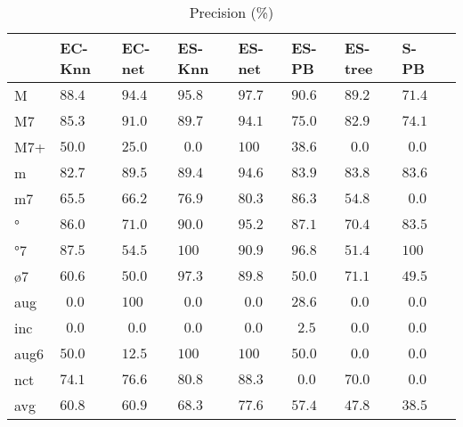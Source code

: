 \documentclass{article}
\begin{document}
\begin{table}
  \centering
\begin{tabular}{l|p{0.5cm}p{0.5cm}p{0.5cm}p{0.5cm}p{0.5cm}p{0.5cm}p{0.5cm}p{0.5cm}}
     &   EC-Knn &   EC-net &   ES-Knn &   ES-net &    ES-PB &  ES-tree &   S-PB \\ \hline
   M & $  88.4$ & $  94.4$ & $  95.8$ & $  97.7$ & $  90.6$ & $  89.2$ & $  71.4$ \\
  M7 & $  85.3$ & $  91.0$ & $  89.7$ & $  94.1$ & $  75.0$ & $  82.9$ & $  74.1$ \\
 M7+ & $  50.0$ & $  25.0$ & $ ~~0.0$ & $ 100  $ & $  38.6$ & $ ~~0.0$ & $ ~~0.0$ \\
   m & $  82.7$ & $  89.5$ & $  89.4$ & $  94.6$ & $  83.9$ & $  83.8$ & $  83.6$ \\
  m7 & $  65.5$ & $  66.2$ & $  76.9$ & $  80.3$ & $  86.3$ & $  54.8$ & $ ~~0.0$ \\
  °  & $  86.0$ & $  71.0$ & $  90.0$ & $  95.2$ & $  87.1$ & $  70.4$ & $  83.5$ \\
 °7  & $  87.5$ & $  54.5$ & $ 100$   & $  90.9$ & $  96.8$ & $  51.4$ & $ 100$ \\
 ø7  & $  60.6$ & $  50.0$ & $  97.3$ & $  89.8$ & $  50.0$ & $  71.1$ & $  49.5$ \\
 aug & $ ~~0.0$ & $ 100  $ & $ ~~0.0$ & $ ~~0.0$ & $  28.6$ & $ ~~0.0$ & $ ~~0.0$ \\
 inc & $ ~~0.0$ & $ ~~0.0$ & $ ~~0.0$ & $ ~~0.0$ & $ ~~2.5$ & $ ~~0.0$ & $ ~~0.0$ \\
aug6 & $  50.0$ & $  12.5$ & $ 100  $ & $ 100  $ & $  50.0$ & $ ~~0.0$ & $ ~~0.0$ \\
 nct & $  74.1$ & $  76.6$ & $  80.8$ & $  88.3$ & $ ~~0.0$ & $  70.0$ & $ ~~0.0$ \\
\hline                                                       
avg & $   60.8$ & $  60.9$ & $  68.3$ & $  77.6$ & $  57.4$ & $  47.8$ & $  38.5$ \\
\end{tabular}


  \caption{Precision (\%)}
  \label{tab:precision}
\end{table}
\end{document}
